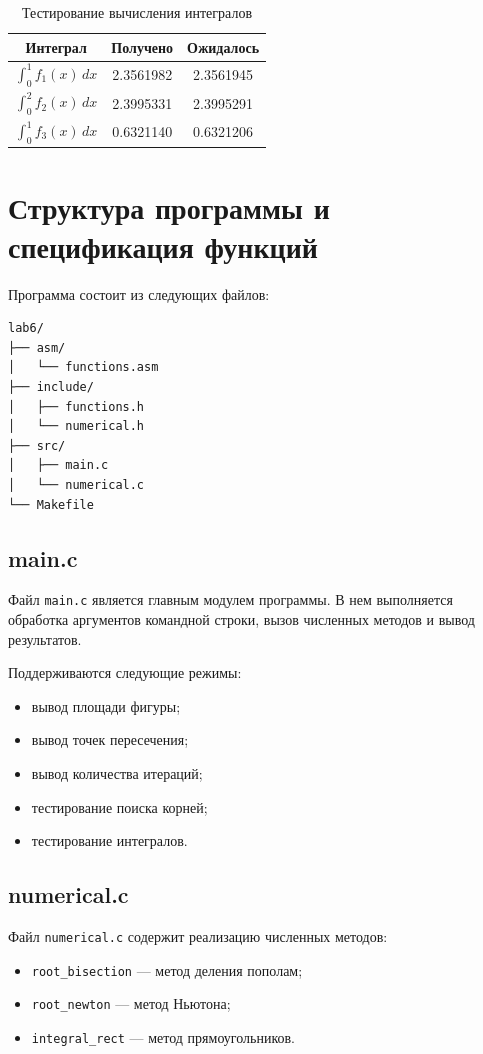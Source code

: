 \documentclass[a4paper,12pt]{article}
\begin{document}
\begin{table}[H]
\centering
\begin{tabular}{|c|c|c|}
\hline
Интеграл & Получено & Ожидалось \\
\hline
$\int_0^1 f_1(x)\,dx$ & 2.3561982 & 2.3561945 \\
\hline
$\int_0^2 f_2(x)\,dx$ & 2.3995331 & 2.3995291 \\
\hline
$\int_0^1 f_3(x)\,dx$ & 0.6321140 & 0.6321206 \\
\hline
\end{tabular}
\caption{Тестирование вычисления интегралов}
\end{table}

\newpage
\section{Структура программы и спецификация функций}
Программа состоит из следующих файлов:
\begin{verbatim}
lab6/
├── asm/
│   └── functions.asm
├── include/
│   ├── functions.h
│   └── numerical.h
├── src/
│   ├── main.c
│   └── numerical.c
└── Makefile
\end{verbatim}

\subsection{main.c}
Файл \texttt{main.c} является главным модулем программы. В нем выполняется обработка аргументов командной строки, вызов численных методов и вывод результатов.

Поддерживаются следующие режимы:
\begin{itemize}
    \item вывод площади фигуры;
    \item вывод точек пересечения;
    \item вывод количества итераций;
    \item тестирование поиска корней;
    \item тестирование интегралов.
\end{itemize}

\subsection{numerical.c}
Файл \texttt{numerical.c} содержит реализацию численных методов:
\begin{itemize}
    \item \texttt{root\_bisection} --- метод деления пополам;
    \item \texttt{root\_newton} --- метод Ньютона;
    \item \texttt{integral\_rect} --- метод прямоугольников.
\end{itemize}
\end{document}
